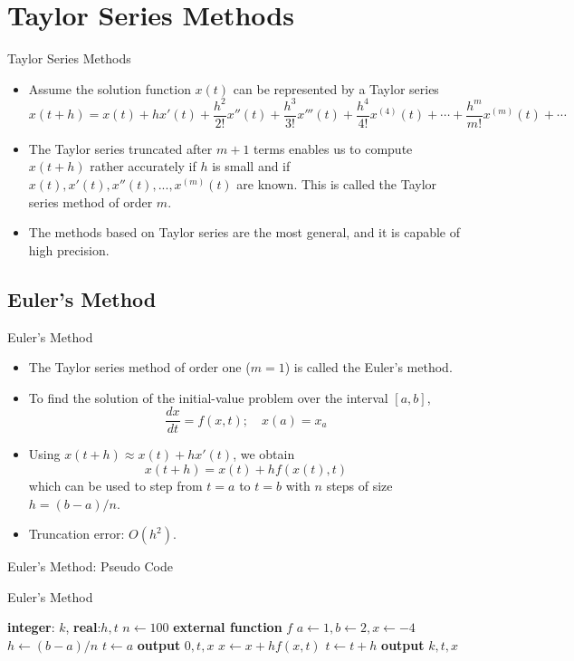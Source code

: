 \documentclass{beamer}
\newcommand{\beforeverb}{\footnotesize}
\newcommand{\afterverb}{\normalsize}
\begin{document}
\section[Taylor Series Methods]{Taylor Series Methods }
\begin{frame}{Taylor Series Methods}

\begin{itemize}
\item Assume the solution function $x(t)$ can be represented by a Taylor series
\beforeverb
\[
x(t+h)=x(t)+h x'(t)+\frac{h^2}{2!}x''(t)+\frac{h^3}{3!}x'''(t)+\frac{h^4}{4!}x^{(4)}(t) +\cdots+\frac{h^m}{m!}x^{(m)}(t)+\cdots
\]
\afterverb
\item The Taylor series truncated after $m+1$ terms enables us to compute $x(t+h)$ rather accurately if $h$ is small and if $x(t),x'(t),x''(t),...,x^{(m)}(t)$ are known. This is called the \alert{Taylor series method of order $m$}.
\item The methods based on Taylor series are the most \alert{general}, and it is capable of \alert{high precision}. 	
\end{itemize}
\end{frame}


\subsection[Euler's Method]{Euler's Method}
\begin{frame}{Euler's Method}

\begin{itemize}
\item The Taylor series method of order one ($m=1$) is called the \alert{Euler's method}.
\item To find the solution of the initial-value problem over the interval $[a,b]$,
\beforeverb
\[
\frac{dx}{dt}=f(x,t);\quad x(a)=x_a
\]
\afterverb
\item Using $x(t+h)\approx x(t)+hx'(t)$, we obtain 
\[
x(t+h)=x(t)+hf(x(t),t)
\]
which can be used to step from $t=a$ to $t=b$ with $n$ steps of size $h=(b-a)/n$.
\item Truncation error: $O(h^2)$.
\end{itemize}
\end{frame}

\begin{frame}{Euler's Method: Pseudo Code}
\begin{block}{Euler's Method}
\begin{algorithmic}[1]
\State \textbf{integer}: $k$, \textbf{real}:$h, t$
\State $n\gets 100$
\State \textbf{external function} $f$
\State $a\gets 1, b  \gets 2, x\gets -4$
\State $h\gets  (b-a)/n$
\State $t\gets a $
\State \textbf{output} $0,t,x$
\State $x \gets x+hf(x,t)$
\State $t\gets t+h$
\State \textbf{output} $k,t,x$
\EndFor
\end{algorithmic}
\end{block}

\end{frame}
\end{document}
